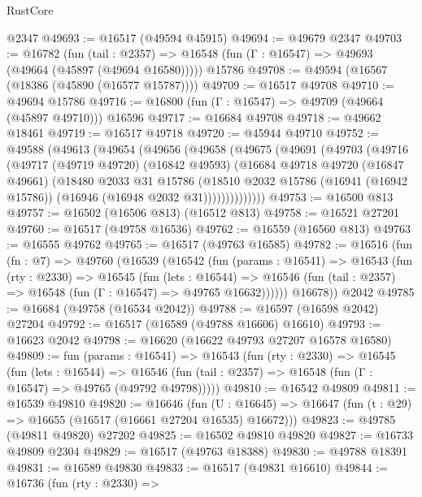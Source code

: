 \begin{lexlean}{RustCore}
\begin{coremodule}
    @2347
@49693 := @16517 (@49594 @45915)
@49694 := @49679 @2347
@49703 := @16782
    (fun (tail : @2357) => @16548 (fun (Γ : @16547) => @49693 (@49664 (@45897 (@49694 @16580)))))
    @15786
@49708 := @49594 (@16567 (@18386 (@45890 (@16577 @15787))))
@49709 := @16517 @49708
@49710 := @49694 @15786
@49716 := @16800 (fun (Γ : @16547) => @49709 (@49664 (@45897 @49710))) @16596
@49717 := @16684 @49708
@49718 := @49662 @18461
@49719 := @16517 @49718
@49720 := @45944 @49710
@49752 := @49588
    (@49613
      (@49654
        (@49656
          (@49658
            (@49675
              (@49691
                (@49703
                  (@49716
                    (@49717
                      (@49719 @49720)
                      (@16842 @49593)
                      (@16684
                        @49718
                        @49720
                        (@16847 @49661)
                        (@18480
                          @2033
                          @31
                          @15786
                          (@18510
                            @2032
                            @15786
                            (@16941 (@16942 @15786))
                            (@16946 (@16948 @2032 @31))))))))))))))
@49753 := @16500 @813
@49757 := @16502 (@16506 @813) (@16512 @813)
@49758 := @16521 @27201
@49760 := @16517 (@49758 @16536)
@49762 := @16559 (@16560 @813)
@49763 := @16555 @49762
@49765 := @16517 (@49763 @16585)
@49782 := @16516
    (fun (fn : @7) =>
    @49760
      (@16539
        (@16542
          (fun (params : @16541) =>
          @16543
            (fun (rty : @2330) =>
            @16545
              (fun (lets : @16544) =>
              @16546 (fun (tail : @2357) => @16548 (fun (Γ : @16547) => @49765 @16632))))))
        @16678))
    @2042
@49785 := @16684 (@49758 (@16534 @2042))
@49788 := @16597 (@16598 @2042) @27204
@49792 := @16517 (@16589 (@49788 @16606) @16610)
@49793 := @16623 @2042
@49798 := @16620 (@16622 @49793 @27207 @16578 @16580)
@49809 := fun (params : @16541) =>
  @16543
    (fun (rty : @2330) =>
    @16545
      (fun (lets : @16544) =>
      @16546 (fun (tail : @2357) => @16548 (fun (Γ : @16547) => @49765 (@49792 @49798)))))
@49810 := @16542 @49809
@49811 := @16539 @49810
@49820 := @16646
    (fun (U : @16645) => @16647 (fun (t : @29) => @16655 (@16517 (@16661 @27204 @16535) @16672)))
@49823 := @49785 (@49811 @49820) @27202
@49825 := @16502 @49810 @49820
@49827 := @16733 @49809 @2304
@49829 := @16517 (@49763 @18388)
@49830 := @49788 @18391
@49831 := @16589 @49830
@49833 := @16517 (@49831 @16610)
@49844 := @16736
    (fun (rty : @2330) =>

\end{coremodule}
\end{lexlean}

